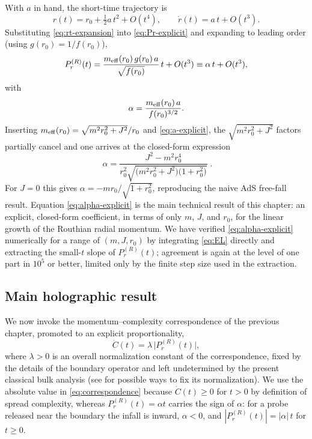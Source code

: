 \documentclass[11pt]{article}
\begin{document}
With $a$ in hand, the short-time trajectory is
\begin{equation}
r(t) = r_0 + \tfrac12 a\,t^2 + O(t^4), \qquad \dot r(t) = a\,t+O(t^3) .
\label{eq:rt-expansion}
\end{equation}
Substituting \eqref{eq:rt-expansion} into \eqref{eq:Pr-explicit} and expanding to leading order (using $g(r_0)=1/f(r_0)$),
\begin{equation}
P_r^{(R)}(t) = \frac{m_{\rm eff}(r_0)\,g(r_0)\,a}{\sqrt{f(r_0)}}\,t + O(t^3)
\equiv \alpha\,t+O(t^3),
\end{equation}
with
\begin{equation}
\alpha = \frac{m_{\rm eff}(r_0)\,a}{f(r_0)^{3/2}} .
\end{equation}
Inserting $m_{\rm eff}(r_0)=\sqrt{m^2r_0^2+J^2}/r_0$ and \eqref{eq:a-explicit}, the $\sqrt{m^2r_0^2+J^2}$ factors partially cancel and one arrives at the closed-form expression
\begin{equation}
\boxed{\;
\alpha = \frac{J^2-m^2r_0^4}{r_0^2\sqrt{\big(m^2r_0^2+J^2\big)\big(1+r_0^2\big)}} \; } .
\label{eq:alpha-explicit}
\end{equation}
For $J=0$ this gives $\alpha=-mr_0/\sqrt{1+r_0^2}$, reproducing the naive AdS free-fall result. Equation \eqref{eq:alpha-explicit} is the main technical result of this chapter: an explicit, closed-form coefficient, in terms of only $m$, $J$, and $r_0$, for the linear growth of the Routhian radial momentum. We have verified \eqref{eq:alpha-explicit} numerically for a range of $(m,J,r_0)$ by integrating \eqref{eq:EL} directly and extracting the small-$t$ slope of $P_r^{(R)}(t)$; agreement is again at the level of one part in $10^5$ or better, limited only by the finite step size used in the extraction.



\subsection{Main holographic result}
\label{subsec:mainresult}

We now invoke the momentum--complexity correspondence of the previous chapter, promoted to an explicit proportionality,
\begin{equation}
\dot C(t) = \lambda\,\big|P_r^{(R)}(t)\big| ,
\label{eq:correspondence}
\end{equation}
where $\lambda>0$ is an overall normalization constant of the correspondence, fixed by the details of the boundary operator and left undetermined by the present classical bulk analysis (see \cite{Parker:2018yvk,Balasubramanian:2022tpr,Nastase:2026lhz} for possible ways to fix its normalization). We use the absolute value in \eqref{eq:correspondence} because $\dot C(t)\geq0$ for $t>0$ by definition of spread complexity, whereas $P_r^{(R)}(t)=\alpha t$ carries the sign of $\alpha$: for a probe released near the boundary the infall is inward, $\alpha<0$, and $|P_r^{(R)}(t)|=|\alpha|\,t$ for $t\ge0$.
\end{document}
